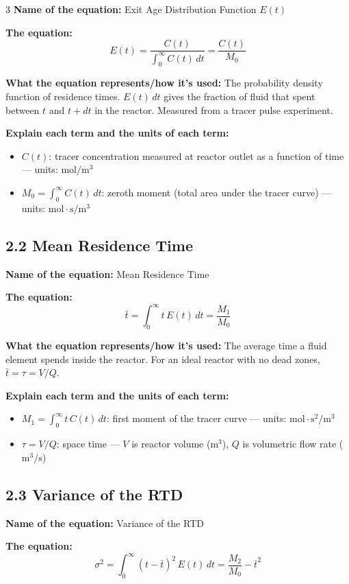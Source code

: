 \documentclass[8pt]{extarticle}
\begin{document}
\begin{multicols*}{3}
\textbf{Name of the equation:} Exit Age Distribution Function \(E(t)\)

\textbf{The equation:}
\[
E(t)=\frac{C(t)}{\int_0^\infty C(t)\,dt}=\frac{C(t)}{M_0}
\]

\textbf{What the equation represents/how it's used:} The probability density function of residence times. \(E(t)\,dt\) gives the fraction of fluid that spent between \(t\) and \(t+dt\) in the reactor. Measured from a tracer pulse experiment.

\textbf{Explain each term and the units of each term:}
\begin{itemize}
\item \(C(t)\): tracer concentration measured at reactor outlet as a function of time --- units: \(\mathrm{mol/m^3}\)
\item \(M_0=\int_0^\infty C(t)\,dt\): zeroth moment (total area under the tracer curve) --- units: \(\mathrm{mol\cdot s/m^3}\)
\end{itemize}

\subsection*{2.2 Mean Residence Time}

\textbf{Name of the equation:} Mean Residence Time

\textbf{The equation:}
\[
\bar{t}=\int_0^\infty t\,E(t)\,dt=\frac{M_1}{M_0}
\]

\textbf{What the equation represents/how it's used:} The average time a fluid element spends inside the reactor. For an ideal reactor with no dead zones, \(\bar{t}=\tau=V/Q\).

\textbf{Explain each term and the units of each term:}
\begin{itemize}
\item \(M_1=\int_0^\infty t\,C(t)\,dt\): first moment of the tracer curve --- units: \(\mathrm{mol\cdot s^2/m^3}\)
\item \(\tau=V/Q\): space time --- \(V\) is reactor volume (\(\mathrm{m^3}\)), \(Q\) is volumetric flow rate (\(\mathrm{m^3/s}\))
\end{itemize}

\subsection*{2.3 Variance of the RTD}

\textbf{Name of the equation:} Variance of the RTD

\textbf{The equation:}
\[
\sigma^2=\int_0^\infty (t-\bar{t})^2\,E(t)\,dt=\frac{M_2}{M_0}-\bar{t}^2
\]


\end{multicols*}
\end{document}
